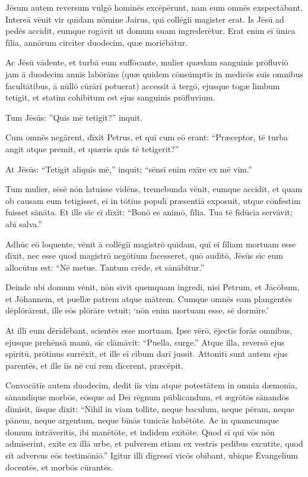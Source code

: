 \Versus Jēsum autem reversum vulgō hominēs excēpērunt, nam eum omnēs exspectābant.
\Versus Intereā vēnit vir quīdam nōmine Jairus, quī collēgiī magister erat. Is Jēsū ad pedēs accidit, eumque rogāvit ut domum suam ingrederētur.
\Versus Erat enim eī ūnica fīlia, annōrum circiter duodecim, quæ moriēbātur.

\Versus Ac Jēsū vādente, et turbā eum suffōcante, mulier quædam sanguinis prōfluviō jam ā duodecim annīs labōrāns (quæ quidem cōnsūmptīs in medicōs suīs omnibus facultātibus, ā nūllō cūrārī potuerat)
\Versus accessit ā tergō, ejusque togæ limbum tetigit, et statim cohibitum est ejus sanguinis prōfluvium.

\Versus Tum Jēsūs: ''Quis mē tetigit?'' inquit.

Cum omnēs negārent, dīxit Petrus, et quī cum eō erant: ``Præceptor, tē turba angit atque premit, et quæris quis tē tetigerit?''

\Versus At Jēsūs: ``Tetigit aliquis mē,'' inquit; ``sēnsī enim exīre ex mē vim.''

\Versus Tum mulier, sēsē nōn latuisse vidēns, tremebunda vēnit, eumque accidit, et quam ob causam eum tetigisset, eī in tōtīus populī præsentiā exposuit, utque cōnfestim fuisset sānāta.
\Versus Et ille sīc eī dīxit: ``Bonō es animō, fīlia. Tua tē fīdūcia servāvit; abī salva.''

\Versus Adhūc eō loquente, vēnit ā collēgiī magistrō quīdam, quī eī fīliam mortuam esse dīxit, nec esse quod magistrō negōtium facesseret,
\Versus quō audītō, Jēsūs sīc eum allocūtus est: ``Nē metue. Tantum crēde, et sānābitur.''

\Versus Deinde ubi domum vēnit, nōn sīvit quemquam ingredī, nisi Petrum, et Jācōbum, et Jōhannem, et puellæ patrem atque mātrem.
\Versus Cumque omnēs eam plangentēs dēplōrārent, ille eōs plōrāre vetuit; `nōn enim mortuam esse, sē dormīre.'

\Versus At illī eum dērīdēbant, scientēs esse mortuam.
\Versus Ipse vērō, ējectīs forās omnibus, ejusque prehēnsā manū, sīc clāmāvit: ``Puella, surge.''
\Versus Atque illa, reversō ejus spīritū, prōtinus surrēxit, et ille eī cibum darī jussit.
\Versus Attonitī sunt autem ejus parentēs, et ille iīs nē cui rem dīcerent, præcēpit.


\Caput
\Versus Convocātīs autem duodecim, dedit iīs vim atque potestātem in omnia dæmonia, sānandīque morbōs,
\Versus eōsque ad Deī rēgnum pūblicandum, et ægrōtōs sānandōs dīmīsit,
\Versus iīsque dīxit: ``Nihil in viam tollite, neque baculum, neque pēram, neque pānem, neque argentum, neque bīnās tunicās habētōte.
\Versus Ac in quamcumque domum intrāveritis, ibi manētōte, et indidem exītōte.
\Versus Quod sī quī vōs nōn admīserint, exīte ex illā urbe, et pulverem etiam ex vestrīs pedibus excutite, quod sit adversus eōs testimōniō.''
\Versus Igitur illī dīgressī vīcōs obībant, ubīque Ēvangelium docentēs, et morbōs cūrantēs.

